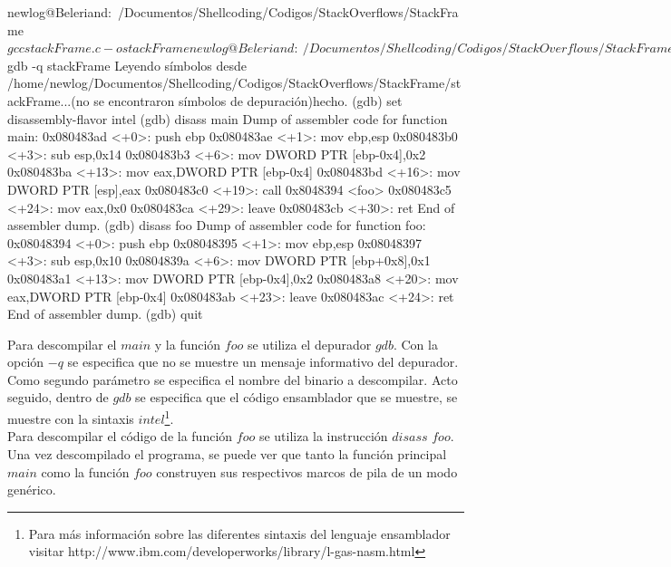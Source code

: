 \documentclass [titlepage, 12pt]{article}
\begin{document}
\begin{listing}[style=consola, numbers=none, caption=Ejecutable stackFrame descompilado]	
newlog@Beleriand:~/Documentos/Shellcoding/Codigos/StackOverflows/StackFrame$ gcc stackFrame.c -o stackFrame
newlog@Beleriand:~/Documentos/Shellcoding/Codigos/StackOverflows/StackFrame$ gdb -q stackFrame
Leyendo símbolos desde /home/newlog/Documentos/Shellcoding/Codigos/StackOverflows/StackFrame/stackFrame...(no se encontraron símbolos de depuración)hecho.
(gdb) set disassembly-flavor intel
(gdb) disass main
Dump of assembler code for function main:
   0x080483ad <+0>:	push   ebp
   0x080483ae <+1>:	mov    ebp,esp
   0x080483b0 <+3>:	sub    esp,0x14
   0x080483b3 <+6>:	mov    DWORD PTR [ebp-0x4],0x2
   0x080483ba <+13>:	mov    eax,DWORD PTR [ebp-0x4]
   0x080483bd <+16>:	mov    DWORD PTR [esp],eax
   0x080483c0 <+19>:	call   0x8048394 <foo>
   0x080483c5 <+24>:	mov    eax,0x0
   0x080483ca <+29>:	leave  
   0x080483cb <+30>:	ret    
End of assembler dump.
(gdb) disass foo
Dump of assembler code for function foo:
   0x08048394 <+0>:	push   ebp
   0x08048395 <+1>:	mov    ebp,esp
   0x08048397 <+3>:	sub    esp,0x10
   0x0804839a <+6>:	mov    DWORD PTR [ebp+0x8],0x1
   0x080483a1 <+13>:	mov    DWORD PTR [ebp-0x4],0x2
   0x080483a8 <+20>:	mov    eax,DWORD PTR [ebp-0x4]
   0x080483ab <+23>:	leave  
   0x080483ac <+24>:	ret    
End of assembler dump.
(gdb) quit
\end{listing}

Para descompilar el $main$ y la funci\'on $foo$ se utiliza el depurador $gdb$. Con la opci\'on $-q$ se especifica que no se muestre un mensaje informativo del depurador. Como segundo par\'ametro se especifica el nombre del binario a descompilar. Acto seguido, dentro de $gdb$ se especifica que el c\'odigo ensamblador que se muestre, se muestre con la sintaxis $intel$\footnote{Para m\'as informaci\'on sobre las diferentes sintaxis del lenguaje ensamblador visitar http://www.ibm.com/developerworks/library/l-gas-nasm.html}.\\
Para descompilar el c\'odigo de la funci\'on $foo$ se utiliza la instrucci\'on $disass$ $foo$.\\

Una vez descompilado el programa, se puede ver que tanto la funci\'on principal $main$ como la funci\'on $foo$ construyen sus respectivos marcos de pila de un modo gen\'erico.\\
\end{document}
